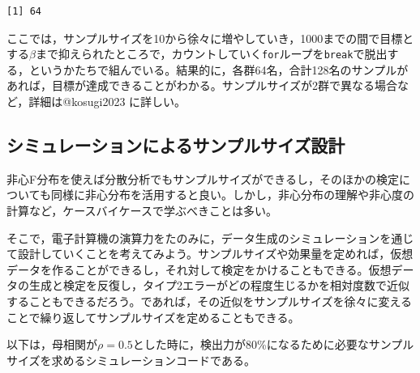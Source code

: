 \documentclass[
  a4paper,
]{ltjsbook}
\begin{document}
\begin{verbatim}
[1] 64
\end{verbatim}

ここでは，サンプルサイズを10から徐々に増やしていき，1000までの間で目標とする\(\beta\)まで抑えられたところで，カウントしていく\texttt{for}ループを\texttt{break}で脱出する，というかたちで組んでいる。結果的に，各群64名，合計128名のサンプルがあれば，目標が達成できることがわかる。サンプルサイズが2群で異なる場合など，詳細は@kosugi2023
に詳しい。

\subsection{シミュレーションによるサンプルサイズ設計}\label{ux30b7ux30dfux30e5ux30ecux30fcux30b7ux30e7ux30f3ux306bux3088ux308bux30b5ux30f3ux30d7ux30ebux30b5ux30a4ux30baux8a2dux8a08}

非心F分布を使えば分散分析でもサンプルサイズができるし，そのほかの検定についても同様に非心分布を活用すると良い。しかし，非心分布の理解や非心度の計算など，ケースバイケースで学ぶべきことは多い。

そこで，電子計算機の演算力をたのみに，データ生成のシミュレーションを通じて設計していくことを考えてみよう。サンプルサイズや効果量を定めれば，仮想データを作ることができるし，それ対して検定をかけることもできる。仮想データの生成と検定を反復し，タイプ2エラーがどの程度生じるかを相対度数で近似することもできるだろう。であれば，その近似をサンプルサイズを徐々に変えることで繰り返してサンプルサイズを定めることもできる。

以下は，母相関が\(\rho = 0.5\)とした時に，検出力が80\%になるために必要なサンプルサイズを求めるシミュレーションコードである。
\end{document}

